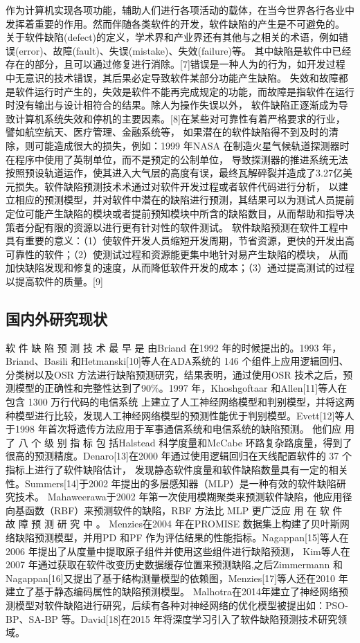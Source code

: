 \documentclass[12pt, a4paper]{article}
\begin{document}
作为计算机实现各项功能，辅助人们进行各项活动的载体，在当今世界各行各业中发挥着重要的作用。然而伴随各类软件的开发，软件缺陷的产生是不可避免的。
关于软件缺陷(defect)的定义，学术界和产业界还有其他与之相关的术语，例如错误(error)、故障(fault)、失误(mistake)、失效(failure)等。
其中缺陷是软件中已经存在的部分，且可以通过修复进行消除。[7]错误是一种人为的行为，如开发过程中无意识的技术错误，其后果必定导致软件某部分功能产生缺陷。
失效和故障都是软件运行时产生的，失效是软件不能再完成规定的功能，而故障是指软件在运行时没有输出与设计相符合的结果。除人为操作失误以外，
软件缺陷正逐渐成为导致计算机系统失效和停机的主要因素。[8]在某些对可靠性有着严格要求的行业，譬如航空航天、医疗管理、金融系统等，
如果潜在的软件缺陷得不到及时的清除，则可能造成很大的损失，例如：1999 年NASA 在制造火星气候轨道探测器时在程序中使用了英制单位，而不是预定的公制单位，
导致探测器的推进系统无法按照预设轨道运作，使其进入大气层的高度有误，最终瓦解碎裂并造成了3.27亿美元损失。软件缺陷预测技术术通过对软件开发过程或者软件代码进行分析，
以建立相应的预测模型，并对软件中潜在的缺陷进行预测，其结果可以为测试人员提前定位可能产生缺陷的模块或者提前预知模块中所含的缺陷数目，从而帮助和指导决策者分配有限的资源以进行更有针对性的软件测试。
软件缺陷预测在软件工程中具有重要的意义：（1）使软件开发人员缩短开发周期，节省资源，更快的开发出高可靠性的软件；（2）使测试过程和资源能更集中地针对易产生缺陷的模块，
从而加快缺陷发现和修复的速度，从而降低软件开发的成本；（3）通过提高测试的过程以提高软件的质量。[9]

\subsection{国内外研究现状}

软 件 缺 陷 预 测 技 术 最 早 是 由Briand 在1992 年的时候提出的。1993 年，Briand、Basili 和Hetmanski[10]等人在ADA系统的 146 个组件上应用逻辑回归、
分类树以及OSR 方法进行缺陷预测研究，结果表明，通过使用OSR 技术之后，预测模型的正确性和完整性达到了90\%。1997 年，Khoshgoftaar 和Allen[11]等人在包含 1300 万行代码的电信系统
上建立了人工神经网络模型和判别模型，并将这两种模型进行比较，发现人工神经网络模型的预测性能优于判别模型。Evett[12]等人于1998 年首次将遗传方法应用于军事通信系统和电信系统的缺陷预测。
他们应 用 了 八 个 级 别 指 标 包 括Halstead 科学度量和McCabe 环路复杂路度量，得到了很高的预测精度。Denaro[13]在2000 年通过使用逻辑回归在天线配置软件的 37 个指标上进行了软件缺陷估计，
发现静态软件度量和软件缺陷数量具有一定的相关性。Summers[14]于2002 年提出的多层感知器（MLP）是一种有效的软件缺陷研究技术。
Mahaweerawa于2002 年第一次使用模糊聚类来预测软件缺陷，他应用径向基函数（RBF）来预测软件的缺陷，RBF 方法比 MLP 更广泛应 用 在 软 件 故 障 预 测 研 究 中 。
Menzies在2004 年在PROMISE 数据集上构建了贝叶斯网络缺陷预测模型，并用PD 和PF 作为评估结果的性能指标。Nagappan[15]等人在 2006 年提出了从度量中提取原子组件并使用这些组件进行缺陷预测，
Kim等人在2007 年通过获取在软件改变历史数据缓存位置来预测缺陷,之后Zimmermann 和Nagappan[16]又提出了基于结构测量模型的依赖图，Menzies[17]等人还在2010 年建立了基于静态编码属性的缺陷预测模型。
Malhotra在2014年建立了神经网络预测模型对软件缺陷进行研究，后续有各种对神经网络的优化模型被提出如：PSO-BP、SA-BP 等。David[18]在2015 年将深度学习引入了软件缺陷预测技术研究领域。
\end{document}
